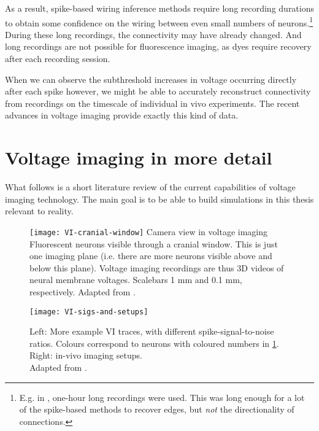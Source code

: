As a result, spike-based wiring inference methods require long recording durations to obtain some confidence on the wiring between even small numbers of neurons.\footnote{
    E.g. in \cite{Orlandi2017FirstConnectomicsChallenge}, one-hour long recordings were used. This was long enough for a lot of the spike-based methods to recover edges, but \emph{not} the directionality of connections.
}
During these long recordings, the connectivity may have already changed. And long recordings are not possible for fluorescence imaging, as dyes require recovery after each recording session.

When we can observe the subthreshold increases in voltage occurring directly after each spike however, we might be able to accurately reconstruct connectivity from recordings on the timescale of individual in vivo experiments. The recent advances in voltage imaging provide exactly this kind of data.



\clearpage
\section{Voltage imaging in more detail}
\label{sec:voltage-imaging}

What follows is a short literature review of the current capabilities of voltage imaging technology. The main goal is to be able to build simulations in this thesis relevant to reality.

\FloatBarrier

\begin{figure}
    \texttt{[image: VI-cranial-window]}
    \captionn
        {Camera view in voltage imaging}
        {Fluorescent neurons visible through a cranial window. This is just one imaging plane (i.e. there are more neurons visible above and below this plane). Voltage imaging recordings are thus 3D videos of neural membrane voltages.
        Scalebars 1 mm and 0.1 mm, respectively.
        Adapted from \cite{Abdelfattah2019BrightPhotostableChemigenetic,Knopfel2019OpticalVoltageImaging}.}
    \label{fig:VI-cranial-window}
\end{figure}

\begin{figure}
    \texttt{[image: VI-sigs-and-setups]}
    \caption
        {Left: More example VI traces, with different spike-signal-to-noise ratios. Colours correspond to neurons with coloured numbers in \cref{fig:VI-cranial-window}. Right: in-vivo imaging setups.\\
        Adapted from \cite{Abdelfattah2019BrightPhotostableChemigenetic,Knopfel2019OpticalVoltageImaging}.}
    \label{fig:VI-sigs-and-setups}
\end{figure}



